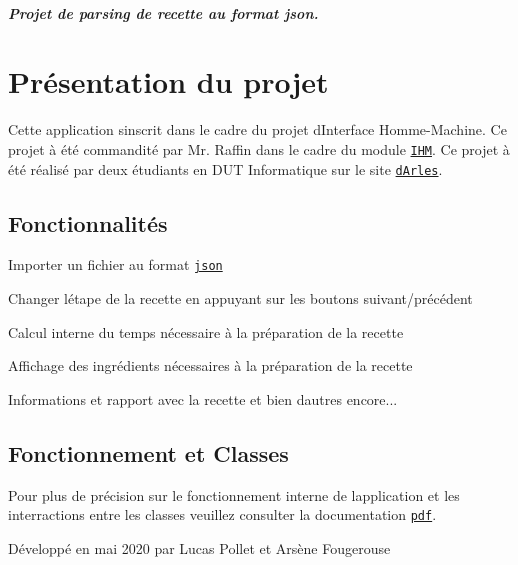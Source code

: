 \subparagraph*{Projet de parsing de recette au format json.}

\href{https://nodesource.com/products/nsolid}{\tt }

\href{https://etulab.univ-amu.fr/f19003179/projet-recette-json}{\tt }\hypertarget{autotoc_md0_autotoc_md1}{}\section{Présentation du projet}\label{autotoc_md0_autotoc_md1}
Cette application s\textquotesingle{}inscrit dans le cadre du projet d\textquotesingle{}Interface Homme-\/\+Machine. Ce projet à été commandité par Mr. Raffin dans le cadre du module \href{https://fr.wikipedia.org/wiki/Interactions_homme-machine}{\tt I\+HM}. Ce projet à été réalisé par deux étudiants en D\+UT Informatique sur le site \href{https://fr.wikipedia.org/wiki/Arles}{\tt d\textquotesingle{}Arles}.\hypertarget{autotoc_md0_autotoc_md2}{}\subsection{Fonctionnalités}\label{autotoc_md0_autotoc_md2}

\begin{DoxyItemize}
\item Importer un fichier au format \href{https://fr.wikipedia.org/wiki/Portable_Document_Format}{\tt json}
\item Changer l\textquotesingle{}étape de la recette en appuyant sur les boutons suivant/précédent
\item Calcul interne du temps nécessaire à la préparation de la recette
\item Affichage des ingrédients nécessaires à la préparation de la recette
\item Informations et rapport avec la recette et bien d\textquotesingle{}autres encore...
\end{DoxyItemize}\hypertarget{autotoc_md0_autotoc_md3}{}\subsection{Fonctionnement et Classes}\label{autotoc_md0_autotoc_md3}
Pour plus de précision sur le fonctionnement interne de l\textquotesingle{}application et les interractions entre les classes veuillez consulter la documentation \href{https://fr.wikipedia.org/wiki/Portable_Document_Format}{\tt pdf}.

Développé en mai 2020 par Lucas Pollet et Arsène Fougerouse 